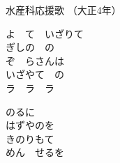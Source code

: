 \documentclass[10pt,b5j]{tarticle} %
\begin{document}
\begin{minipage}[c]{0.7\hsize} %
    \begin{center}
        {\LARGE
            水産科応援歌 %
        }
        {\small 
            （大正4年） %
        }
    \end{center}
\end{minipage}
\begin{minipage}[c]{0.3\hsize} %
    \begin{flushright} %
    \end{flushright}
\end{minipage}

\vspace{1.5em} %
\newcommand{\linespace}{0.5em} %
\newcommand{\blocksize}{0.5\hsize} %
\begin{enumerate} %
    \begin{minipage}[c]{\blocksize}
    
        \vspace{\linespace}
        \item
        よ　て　いざりて\\
        ぎしの　の\\
        ぞ　らさんは\\
        いざやて　の\\
        ラ　ラ　ラ
        
        \vspace{\linespace}
        \item
        のるに\\
        はずやのを\\
        きのりもて\\
        めん　せるを
    
    \end{minipage}
\end{enumerate} %
\end{document}
